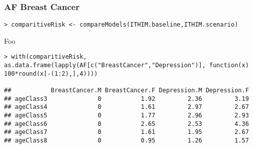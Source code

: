 \documentclass[handout,13pt,compress,c]{beamer}
\begin{document}
\begin{frame}[fragile]
\frametitle{AF Breast Cancer}
\begin{semiverbatim}
\begin{lstlisting}
> comparitiveRisk <- compareModels(ITHIM.baseline,ITHIM.scenario)
\end{lstlisting}
\end{semiverbatim}
Foo
\begin{semiverbatim}
\begin{lstlisting}
> with(comparitiveRisk, as.data.frame(lapply(AF[c("BreastCancer","Depression")], function(x) 100*round(x[-(1:2),],4))))

##           BreastCancer.M BreastCancer.F Depression.M Depression.F
## ageClass3              0           1.92         2.36         3.19
## ageClass4              0           1.61         2.97         2.67
## ageClass5              0           1.77         2.96         2.93
## ageClass6              0           2.65         2.53         4.36
## ageClass7              0           1.61         1.95         2.67
## ageClass8              0           0.95         1.26         1.57
\end{lstlisting}
\end{semiverbatim}
\end{frame}
\end{document}

